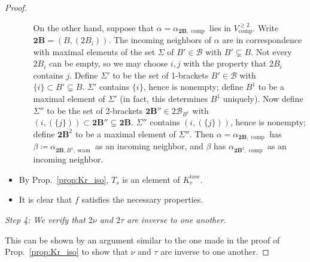 \documentclass[11pt]{amsart}
\theoremstyle{definition}
\theoremstyle{remark}
\theoremstyle{plain}
\newcommand{\btB}{{\mathbf{2B}}}
\newcommand{\sB}{\mathscr{B}}
\newcommand{\stB}{2\mathscr{B}}
\newcommand{\on}{\operatorname}
\newcommand{\comp}{C^2}
\renewcommand{\comp}{{\on{comp}}}
\newcommand{\seam}{{\on{seam}}}
\newcommand{\tree}{{\on{tree}}}
\begin{document}
\begin{proof}
\begin{itemize}
\begin{itemize}
On the other hand, suppose that $\alpha = \alpha_{\btB,\comp}$ lies in $V_\comp^{\geq2}$.
Write $\btB = (B, (2B_i))$.
The incoming neighbors of $\alpha$ are in correspondence with maximal elements of the set $\Sigma$ of $B' \in \sB$ with $B' \subsetneq B$.
Not every $2B_i$ can be empty, so we may choose $i, j$ with the property that $2B_i$ contains $j$.
Define $\Sigma'$ to be the set of 1-brackets $B' \in \sB$ with $\{i\} \subset B' \subsetneq B$.
$\Sigma'$ contains $\{i\}$, hence is nonempty; define $B^1$ to be a maximal element of $\Sigma'$ (in fact, this determines $B^1$ uniquely).
Now define $\Sigma''$ to be the set of 2-brackets $\btB'' \in \stB_{B^1}$ with $(i,(\{j\})) \subset \btB'' \subsetneq \btB$.
$\Sigma''$ contains $(i,(\{j\}))$, hence is nonempty; define $\btB^2$ to be a maximal element of $\Sigma''$.
Then $\alpha = \alpha_{\btB,\comp}$ has $\beta \coloneqq \alpha_{\btB,B^1,\seam}$ as an incoming neighbor, and $\beta$ has $\alpha_{\btB^2,\comp}$ as an incoming neighbor.
\end{itemize}

\item By Prop.~\ref{prop:Kr_iso}, $T_s$ is an element of $K_r^\tree$.

\item It is clear that $f$ satisfies the necessary properties.
\end{itemize}

\medskip

\noindent\emph{Step 4: We verify that $2\nu$ and $2\tau$ are inverse to one another.}

\medskip

\noindent This can be shown by an argument similar to the one made in the proof of Prop.~\ref{prop:Kr_iso} to show that $\nu$ and $\tau$ are inverse to one another.
\end{proof}

\end{document}
